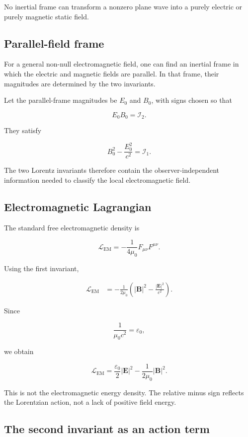 No inertial frame can transform a nonzero plane wave into a purely electric or purely magnetic static field.

\subsection{Parallel-field frame}

For a general non-null electromagnetic field, one can find an inertial frame in which the electric and magnetic fields are parallel. In that frame, their magnitudes are determined by the two invariants.

Let the parallel-frame magnitudes be \(E_0\) and \(B_0\), with signs chosen so that

\[
E_0B_0
=
\mathcal{I}_2.
\]

They satisfy

\[
B_0^2
-
\frac{E_0^2}{c^2}
=
\mathcal{I}_1.
\]

The two Lorentz invariants therefore contain the observer-independent information needed to classify the local electromagnetic field.

\subsection{Electromagnetic Lagrangian}

The standard free electromagnetic density is

\[
\mathcal{L}_{\mathrm{EM}}
=
-
\frac{1}{4\mu_0}
F_{\mu\nu}F^{\mu\nu}.
\]

Using the first invariant,

\[
\begin{aligned}
\mathcal{L}_{\mathrm{EM}}
&=
-
\frac{1}{2\mu_0}
\left(
|\mathbf{B}|^2
-
\frac{|\mathbf{E}|^2}{c^2}
\right).
\end{aligned}
\]

Since

\[
\frac{1}{\mu_0c^2}
=
\varepsilon_0,
\]

we obtain

\[
\boxed{
\mathcal{L}_{\mathrm{EM}}
=
\frac{\varepsilon_0}{2}
|\mathbf{E}|^2
-
\frac{1}{2\mu_0}
|\mathbf{B}|^2
}.
\]

This is not the electromagnetic energy density. The relative minus sign reflects the Lorentzian action, not a lack of positive field energy.

\subsection{The second invariant as an action term}

